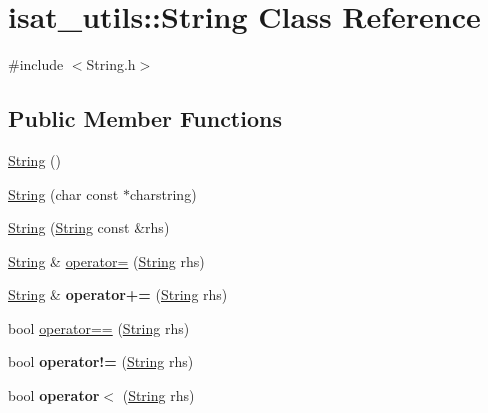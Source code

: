 \hypertarget{classisat__utils_1_1_string}{}\section{isat\+\_\+utils\+:\+:String Class Reference}
\label{classisat__utils_1_1_string}


{\ttfamily \#include $<$String.\+h$>$}

\subsection*{Public Member Functions}
\begin{DoxyCompactItemize}
\item 
\hyperlink{classisat__utils_1_1_string_a016361e98c3ebbc6b6df8137c38077c1}{String} ()
\item 
\hyperlink{classisat__utils_1_1_string_a3f219032bba25fc4c499abb963badb9f}{String} (char const $\ast$charstring)
\item 
\hyperlink{classisat__utils_1_1_string_a6c36434fa43495939a12eab3e5421081}{String} (\hyperlink{classisat__utils_1_1_string}{String} const \&rhs)
\item 
\hyperlink{classisat__utils_1_1_string}{String} \& \hyperlink{classisat__utils_1_1_string_a49c95362b94c3b62d3f6765105c7a7ba}{operator=} (\hyperlink{classisat__utils_1_1_string}{String} rhs)
\item 
\hyperlink{classisat__utils_1_1_string}{String} \& {\bfseries operator+=} (\hyperlink{classisat__utils_1_1_string}{String} rhs)\hypertarget{classisat__utils_1_1_string_a6f91ae8be5b77eb7697f111198c0fa6c}{}\label{classisat__utils_1_1_string_a6f91ae8be5b77eb7697f111198c0fa6c}

\item 
bool \hyperlink{classisat__utils_1_1_string_a44073c5213f18e79e2a78e32665e5a35}{operator==} (\hyperlink{classisat__utils_1_1_string}{String} rhs)
\item 
bool {\bfseries operator!=} (\hyperlink{classisat__utils_1_1_string}{String} rhs)\hypertarget{classisat__utils_1_1_string_a040e21b8c7f6befc168c6561406f2164}{}\label{classisat__utils_1_1_string_a040e21b8c7f6befc168c6561406f2164}

\item 
bool {\bfseries operator$<$} (\hyperlink{classisat__utils_1_1_string}{String} rhs)\hypertarget{classisat__utils_1_1_string_a89b85a69bde172d3b30c7373a86527ae}{}\label{classisat__utils_1_1_string_a89b85a69bde172d3b30c7373a86527ae}


\end{DoxyCompactItemize}
